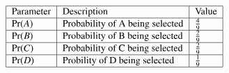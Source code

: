 
\begin{align}
\begin{tabular}{|l|l|l|}\hline
Parameter	&Description	&Value\\\hline
$\Pr(A)$	&Probability of A being selected	&$\frac{4}{9}$\\\hline
$\Pr(B)$	&Probability of B being selected	&$\frac{2}{9}$\\\hline
$\Pr(C)$	&Probability of C being selected	&$\frac{2}{9}$\\\hline
$\Pr(D)$        &Probility of D being selected		&$\frac{1}{9}$\\\hline
\end{tabular}
\end{align}
